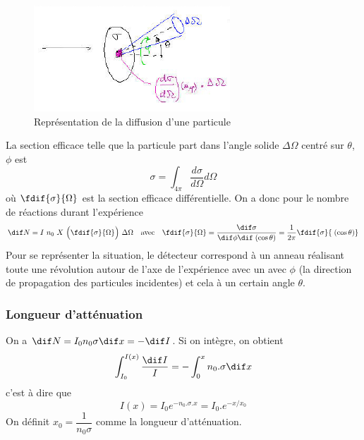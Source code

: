 \begin{figure}[ht]
    \centering
    \includegraphics[scale=0.95]{Images1/secdiff.PNG}
    \caption{Représentation de la diffusion d'une particule}
    \label{fig:diffusion_particule}
\end{figure}
\noindent La section efficace telle que la particule part dans l'angle solide $\Delta\Omega$ centré sur $\theta$, $\phi$ est
\[
    \sigma=\int_{4\pi}^{}\dfrac{d\sigma}{d\Omega}d\Omega
\]
où $\fdif{\sigma}{\Omega}$ est la section efficace différentielle. On a donc pour le nombre de réactions durant l'expérience
\[
    \dif N=I~n_0~X~\Big(\fdif{\sigma}{\Omega}\Big)~\Delta\Omega \quad\text{avec}\quad \fdif{\sigma}{\Omega}=\dfrac{\dif\sigma}{\dif\phi \dif \;(\cos{\theta})}=\dfrac{1}{2\pi}\fdif{\sigma}{\;(\cos{\theta})}
\]
Pour se représenter la situation, le détecteur correspond à un anneau réalisant toute une révolution autour de l'axe de l'expérience avec un avec $\phi$ (la direction de propagation des particules incidentes) et cela à un certain angle $\theta$.

\subsubsection{Longueur d'atténuation}
On a $\dif N=I_0 n_0 \sigma \dif x=-\dif I$. Si on intègre, on obtient
\[
    \int_{I_{0}}^{I(x)}\dfrac{\dif I}{I}=-\int_0^x n_0.\sigma \dif x
\]
c'est à dire que
\[
    I(x)=I_0e^{-n_0.\sigma.x}=I_0.e^{-x/x_0}
\]
On définit $x_0=\dfrac{1}{n_0\sigma}$ comme la longueur d'atténuation.


